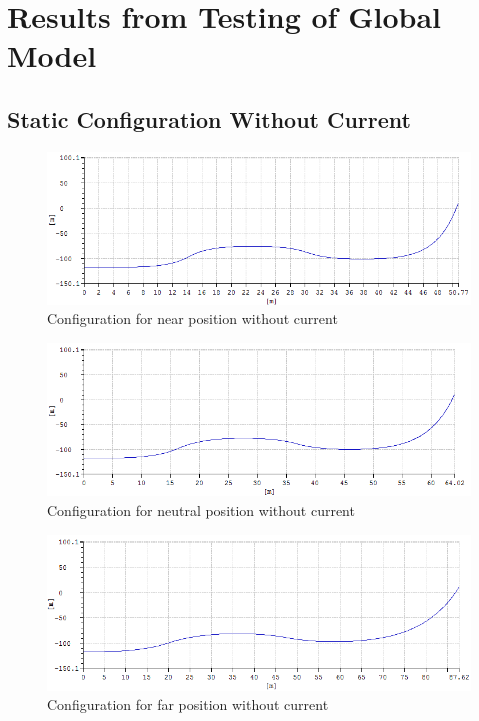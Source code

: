 \chapter{Results from Testing of Global Model}
\label{appendix:A}
\section{Static Configuration Without Current}

\begin{figure}[H]
\centering
\includegraphics[scale=0.5]{figures/confignear}
\caption{Configuration for near position without current}
 \label{fig:confignear}
\end{figure}

\begin{figure}[H]
\centering
\includegraphics[scale=0.5]{figures/configneu}
\caption{Configuration for neutral position without current}
 \label{fig:configneu}
\end{figure}

\begin{figure}[H]
\centering
\includegraphics[scale=0.5]{figures/configfar}
\caption{Configuration for far position without current}
 \label{fig:configfar}
\end{figure}

